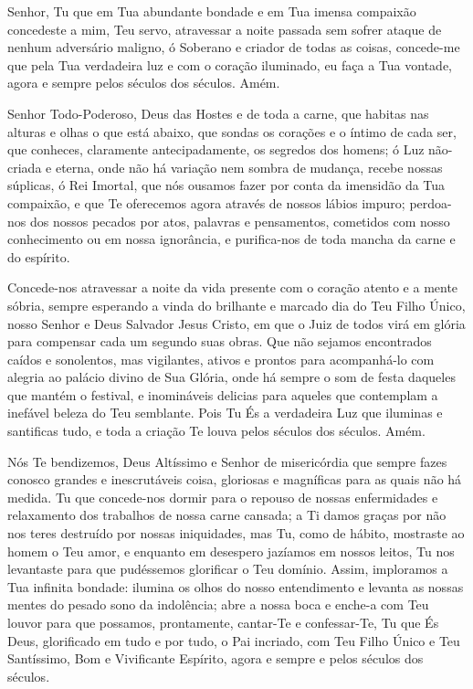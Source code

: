 \documentclass{subfiles}
\begin{document}

Senhor, Tu que em Tua abundante bondade e em Tua imensa compaixão concedeste a
mim, Teu servo, atravessar a noite passada sem sofrer ataque de nenhum
adversário maligno, ó Soberano e criador de todas as coisas, concede-me que pela
Tua verdadeira luz e com o coração iluminado, eu faça a Tua vontade, agora e
sempre pelos séculos dos séculos. Amém.


Senhor Todo-Poderoso, Deus das Hostes e de toda a carne, que habitas nas alturas
e olhas o que está abaixo, que sondas os corações e o íntimo de cada ser, que
conheces, claramente antecipadamente, os segredos dos homens; ó Luz não-criada e
eterna, onde não há variação nem sombra de mudança, recebe nossas súplicas, ó
Rei Imortal, que nós ousamos fazer por conta da imensidão da Tua compaixão, e
que Te oferecemos agora através de nossos lábios impuro; perdoa-nos dos nossos
pecados por atos, palavras e pensamentos, cometidos com nosso conhecimento ou em
nossa ignorância, e purifica-nos de toda mancha da carne e do espírito.

Concede-nos atravessar a noite da vida presente com o coração atento e a mente
sóbria, sempre esperando a vinda do brilhante e marcado dia do Teu Filho Único,
nosso Senhor e Deus Salvador Jesus Cristo, em que o Juiz de todos virá em glória
para compensar cada um segundo suas obras. Que não sejamos encontrados caídos e
sonolentos, mas vigilantes, ativos e prontos para acompanhá-lo com alegria ao
palácio divino de Sua Glória, onde há sempre o som de festa daqueles que mantém
o festival, e inomináveis delicias para aqueles que contemplam a inefável beleza
do Teu semblante. Pois Tu És a verdadeira Luz que iluminas e santificas tudo, e
toda a criação Te louva pelos séculos dos séculos. Amém.


Nós Te bendizemos, Deus Altíssimo e Senhor de misericórdia que
sempre fazes conosco grandes e inescrutáveis coisa, gloriosas e magníficas
para as quais não há medida. Tu que concede-nos dormir para o repouso de
nossas enfermidades e relaxamento dos trabalhos de nossa carne cansada; a
Ti damos graças por não nos teres destruído por nossas iniquidades, mas Tu,
como de hábito, mostraste ao homem o Teu amor, e enquanto em desespero
jazíamos em nossos leitos, Tu nos levantaste para que pudéssemos glorificar o
Teu domínio. Assim, imploramos a Tua infinita bondade: ilumina os olhos do
nosso entendimento e levanta as nossas mentes do pesado sono da indolência;
abre a nossa boca e enche-a com Teu louvor para que possamos, prontamente,
cantar-Te e confessar-Te, Tu que És Deus, glorificado em tudo e por tudo, o Pai
incriado, com Teu Filho Único e Teu Santíssimo, Bom e Vivificante Espírito,
agora e sempre e pelos séculos dos séculos.
\end{document}
